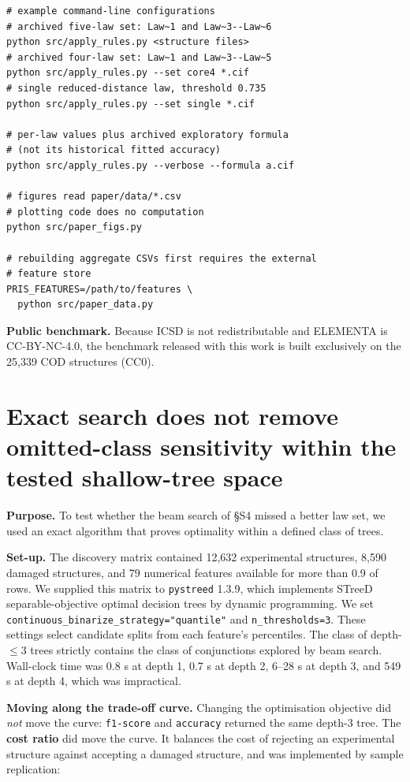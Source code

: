 \begin{verbatim}
# example command-line configurations
# archived five-law set: Law~1 and Law~3--Law~6
python src/apply_rules.py <structure files>
# archived four-law set: Law~1 and Law~3--Law~5
python src/apply_rules.py --set core4 *.cif
# single reduced-distance law, threshold 0.735
python src/apply_rules.py --set single *.cif

# per-law values plus archived exploratory formula
# (not its historical fitted accuracy)
python src/apply_rules.py --verbose --formula a.cif

# figures read paper/data/*.csv
# plotting code does no computation
python src/paper_figs.py

# rebuilding aggregate CSVs first requires the external
# feature store
PRIS_FEATURES=/path/to/features \
  python src/paper_data.py
\end{verbatim}

\textbf{Public benchmark.} Because ICSD is not redistributable and ELEMENTA is
CC-BY-NC-4.0, the benchmark released with this work is built exclusively on the
25,339 COD structures (CC0).

\section{Exact search does not remove omitted-class sensitivity within the tested shallow-tree space}\label{note:s10}

\textbf{Purpose.} To test whether the beam search of \S{}S4 missed a better law set,
we used an exact algorithm that proves optimality within a defined class of trees.

\textbf{Set-up.} The discovery matrix contained 12,632 experimental structures,
8,590 damaged structures, and 79 numerical features available for more than 0.9
of rows. We supplied this matrix to \texttt{pystreed} 1.3.9, which implements
STreeD separable-objective optimal decision trees by dynamic programming. We set
\texttt{continuous\_binarize\_strategy=\allowbreak"quantile"} and
\texttt{n\_thresholds=3}. These settings select candidate splits from each
feature's percentiles. The class of depth-$\leq$3 trees strictly contains the class of conjunctions
explored by beam search. Wall-clock time was 0.8 s at depth 1, 0.7 s at depth 2,
6--28 s at depth 3, and 549 s at depth 4, which was impractical.

\textbf{Moving along the trade-off curve.} Changing the optimisation objective
did \emph{not} move the curve: \texttt{f1-score} and \texttt{accuracy} returned
the same depth-3 tree. The \textbf{cost ratio} did move the curve. It balances
the cost of rejecting an experimental structure against accepting a damaged
structure, and was implemented by sample replication:

